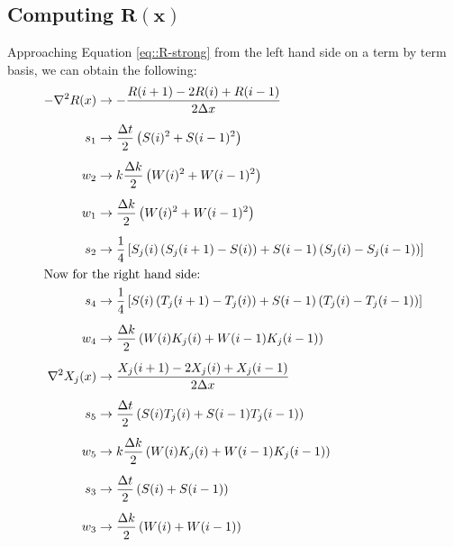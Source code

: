 \documentclass{article}
\def\grad{\mathbf\nabla}
\begin{document}
\subsection{Computing $\mathbf{R(x)}$}
\label{sec::CompR}
Approaching Equation \ref{eq::R-strong} from the left hand side on a term by term basis, we can obtain the following:
\begin{subequations}
\begin{align*}
-\grad^2R(x) &\to -\frac{R(i+1)-2R(i)+R(i-1)}{2\Delta x}  \\[5pt]
s_1 &\to \frac{\Delta t}{2} \left( S(i)^2 + S(i-1)^2 \right) \\[5pt]
w_2 &\to k\frac{\Delta k}{2}\left( W(i)^2+W(i-1)^2\right)   \\[5pt]
w_1 &\to \frac{\Delta k}{2}\left(W(i)^2 + W(i-1)^2 \right)  \\[5pt]
s_2 &\to \frac{1}{4} \left[ S_j(i)\left( S_j(i+1)-S(i) \right) + S(i-1)\left(S_j(i)-S_j(i-1)\right) \right] \\
\intertext{Now for the right hand side:}
s_4 &\to \frac{1}{4} \left[ S(i) \left(T_j(i+1)-T_j(i) \right) + S(i-1)\left(T_j(i)-T_j(i-1)\right) \right] \\[5pt]
w_4 &\to \frac{\Delta k}{2} \left(W(i)K_j(i) + W(i-1)K_j(i-1) \right) \\[5pt]
\grad^2X_j(x) &\to \frac{X_j(i+1)-2X_j(i)+X_j(i-1)}{2\Delta x} \\[5pt]
s_5 &\to \frac{\Delta t}{2} \left(S(i)T_j(i) + S(i-1)T_j(i-1) \right) \\[5pt]
w_5 &\to k\frac{\Delta k}{2} \left(W(i)K_j(i) + W(i-1)K_j(i-1) \right) \\[5pt]
s_3 &\to \frac{\Delta t}{2} \left( S(i) + S(i-1) \right) \\[5pt]
w_3 &\to \frac{\Delta k}{2} \left( W(i) + W(i-1) \right)
\end{align*}
\end{subequations}
\end{document}
